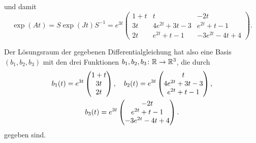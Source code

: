\documentclass[a4paper, 10pt]{article}
\begin{document}
und damit
\[
    \exp(At)
  = S \exp(Jt) S^{-1}
  =
  e^{3t}
  \begin{pmatrix}
    1 + t &              t      &           - 2 t     \\
       3t & 4 e^{2t} + 3 t - 3  &    e^{2t} +   t - 1 \\
       2t &   e^{2t} +   t - 1  & -3 e^{2t} - 4 t + 4
  \end{pmatrix}.
\]

Der Lösungsraum der gegebenen Differentialgleichung hat also eine Basis $(b_1, b_2, b_3)$ mit den drei Funktionen $b_1, b_2, b_3 \colon \mathbb{R} \to \mathbb{R}^3$, die durch
\begin{gather*}
  b_1(t) = e^{3t} \begin{pmatrix} 1+t \\ 3t \\ 2t \end{pmatrix},
  \quad
  b_2(t) = e^{3t} \begin{pmatrix} t \\ 4 e^{2t} + 3 t - 3 \\ e^{2t} + t - 1 \end{pmatrix},     \\
  b_3(t) = e^{3t} \begin{pmatrix} -2t \\ e^{2t} + t - 1 \\ -3 e^{2t} - 4 t + 4 \end{pmatrix}.
\end{gather*}
gegeben sind.
\end{document}
